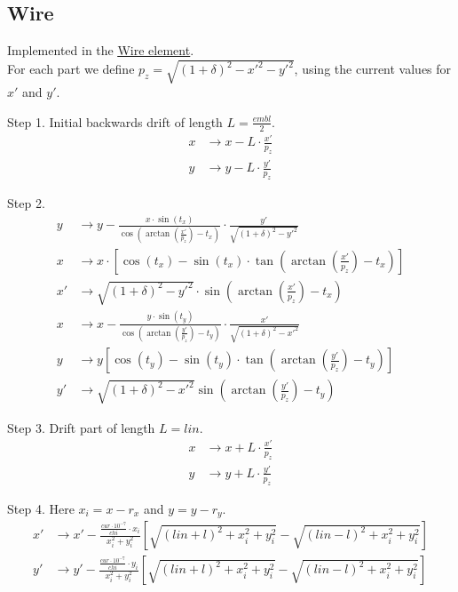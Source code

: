 \subsection{Wire}

Implemented in the \href{https://xsuite.readthedocs.io/en/latest/apireference.html#wire}{\underline{Wire element}}.
~\\

For each part we define $p_z=\sqrt{(1+\delta)^2-x'^2-y'^2}$, using the current values for $x'$ and $y'$.

Step 1. Initial backwards drift of length $L=\frac{embl}{2}$.
\begin{align*}
	x &\to x - L\cdot\frac{x'}{p_z} \\
    y &\to y - L\cdot\frac{y'}{p_z}
\end{align*}

Step 2.
\begin{align*}
	y &\to y - \frac{x\cdot\sin(t_x)}{
    \cos\left(\arctan\left(\frac{x'}{p_z}\right)-t_x\right)}\cdot
    \frac{y'}{\sqrt{(1+\delta)^2-y'^2}} \\
    x &\to x\cdot\left[\cos(t_x)-\sin(t_x)\cdot\tan\left(
    \arctan\left(\frac{x'}{p_z}\right)-t_x\right)\right] \\
    x' &\to \sqrt{(1+\delta)^2-y'^2}\cdot\sin\left(
    \arctan\left(\frac{x'}{p_z}\right)-t_x\right) \\
    x &\to x- \frac{y\cdot\sin(t_y)}{\cos\left(\arctan\left(\frac{y'}{p_z}\right)
    -t_y\right)} \cdot\frac{x'}{\sqrt{(1+\delta)^2-x'^2}} \\
    y &\to y \left[ \cos(t_y) - \sin(t_y)\cdot\tan\left(
    \arctan\left(\frac{y'}{p_z}\right)-t_y\right) \right] \\
    y' &\to \sqrt{(1+\delta)^2-x'^2}\sin\left(\arctan\left(
    \frac{y'}{p_z}\right)-t_y\right)
\end{align*}

Step 3. Drift part of length $L=lin$.
\begin{align*}
    x &\to x + L \cdot \frac{x'}{p_z} \\
    y &\to y + L \cdot \frac{y'}{p_z}
\end{align*}

Step 4. Here $x_i=x-r_x$ and $y=y-r_y$.
\begin{align*}
    x' &\to x' - \frac{\frac{cur\cdot10^{-7}}{chi}\cdot x_i}{x_i^2+y_i^2}
    \left[\sqrt{(lin+l)^2+x_i^2+y_i^2}-\sqrt{(lin-l)^2+x_i^2+y_i^2} \right] \\
    y' &\to y' - \frac{\frac{cur\cdot10^{-7}}{chi}\cdot y_i}{x_i^2+y_i^2}
    \left[\sqrt{(lin+l)^2+x_i^2+y_i^2}-\sqrt{(lin-l)^2+x_i^2+y_i^2} \right]
\end{align*}

